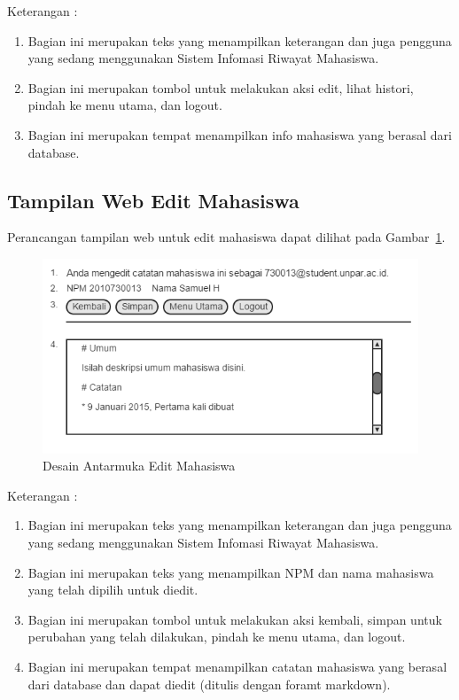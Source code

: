 Keterangan :
\begin{enumerate}[(1)]
\item
Bagian ini merupakan teks yang menampilkan keterangan dan juga pengguna yang sedang menggunakan Sistem Infomasi Riwayat Mahasiswa.
\item
Bagian ini merupakan tombol untuk melakukan aksi edit, lihat histori, pindah
ke menu utama, dan logout.
\item
Bagian ini merupakan tempat menampilkan info mahasiswa yang berasal dari database.
\end{enumerate}

\subsection{Tampilan Web Edit Mahasiswa}
Perancangan tampilan web untuk edit mahasiswa dapat dilihat pada Gambar~\ref{fig:editmahasiswa}.
\begin{figure}[H]
\centering
\includegraphics[scale=0.5]{Gambar/editmahasiswa.png}
\caption[Desain Antarmuka Edit Mahasiswa]{Desain Antarmuka Edit Mahasiswa}
\label{fig:editmahasiswa}
\end{figure}

Keterangan :
\begin{enumerate}[(1)]
\item
Bagian ini merupakan teks yang menampilkan keterangan dan juga pengguna yang
sedang menggunakan Sistem Infomasi Riwayat Mahasiswa.
\item
Bagian ini merupakan teks yang menampilkan NPM dan nama mahasiswa yang telah
dipilih untuk diedit.
\item
Bagian ini merupakan tombol untuk melakukan aksi kembali, simpan untuk perubahan
yang telah dilakukan, pindah ke menu utama, dan logout.
\item
Bagian ini merupakan tempat menampilkan catatan mahasiswa yang berasal dari
database dan dapat diedit (ditulis dengan foramt markdown).
\end{enumerate}

